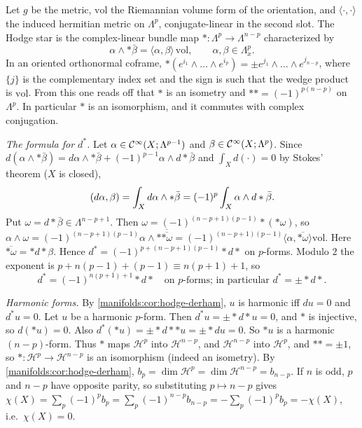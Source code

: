 \subsection*{}
Let $g$ be the metric, $\mathrm{vol}$ the Riemannian volume form of the orientation, and
$\langle\cdot,\cdot\rangle$ the induced hermitian metric on $\Lambda^p$, conjugate-linear in the
second slot. The Hodge star is the complex-linear bundle map
$*:\Lambda^p\to\Lambda^{n-p}$ characterized by
\begin{equation*}
\alpha\wedge*\bar\beta=\langle\alpha,\beta\rangle\,\mathrm{vol},\qquad\alpha,\beta\in\Lambda^p_x .
\end{equation*}
In an oriented orthonormal coframe, $*(e^{i_1}\wedge\dots\wedge e^{i_p})=\pm e^{j_1}\wedge\dots\wedge e^{j_{n-p}}$, where
$\{j\}$ is the complementary index set and the sign is such that the wedge product is
$\mathrm{vol}$. From this one reads off that $*$ is an isometry and $**=(-1)^{p(n-p)}$ on
$\Lambda^p$. In particular $*$ is an isomorphism, and it commutes with complex conjugation.

\emph{The formula for $d^*$.} Let $\alpha\in\mathcal{C}^\infty(X;\Lambda^{p-1})$ and $\beta\in\mathcal{C}^\infty(X;\Lambda^p)$.
Since $d(\alpha\wedge*\bar\beta)=d\alpha\wedge*\bar\beta+(-1)^{p-1}\alpha\wedge d*\bar\beta$ and
$\int_Xd(\cdot)=0$ by Stokes' theorem ($X$ is closed),
\begin{equation*}
( d\alpha, \beta)=\int_Xd\alpha\wedge*\bar\beta=(-1)^p\int_X\alpha\wedge d*\bar\beta .
\end{equation*}
Put $\omega=d*\bar\beta\in\Lambda^{n-p+1}$. Then $\omega=(-1)^{(n-p+1)(p-1)}*(*\omega)$, so
$\alpha\wedge\omega=(-1)^{(n-p+1)(p-1)}\alpha\wedge*\overline{\overline{*\omega}}
=(-1)^{(n-p+1)(p-1)}\langle\alpha,\overline{*\omega}\rangle\mathrm{vol}$. Here
$\overline{*\omega}=*d*\beta$. Hence $d^*=(-1)^{p+(n-p+1)(p-1)}*d*$ on $p$-forms. Modulo
$2$ the exponent is $p+n(p-1)+(p-1)\equiv n(p+1)+1$, so
\begin{equation*}
d^*=(-1)^{n(p+1)+1}*d*\quad\text{on $p$-forms; in particular } d^*=\pm*d* .
\end{equation*}

\emph{Harmonic forms.} By \cref{manifolds:cor:hodge-derham}, $u$ is harmonic iff $du=0$ and
$d^*u=0$. Let $u$ be a harmonic $p$-form. Then $d^*u=\pm*d*u=0$, and $*$ is injective, so
$d(*u)=0$. Also $d^*(*u)=\pm*d**u=\pm*du=0$. So $*u$ is a harmonic $(n-p)$-form. Thus $*$
maps $\mathcal H^p$ into $\mathcal H^{n-p}$, and $\mathcal H^{n-p}$ into $\mathcal H^p$, and
$**=\pm1$, so $*:\mathcal H^p\to\mathcal H^{n-p}$ is an isomorphism (indeed an isometry). By
\cref{manifolds:cor:hodge-derham}, $b_p=\dim\mathcal H^p=\dim\mathcal H^{n-p}=b_{n-p}$. If $n$ is
odd, $p$ and $n-p$ have opposite parity, so substituting $p\mapsto n-p$ gives
$\chi(X)=\sum_p(-1)^pb_p=\sum_p(-1)^{n-p}b_{n-p}=-\sum_p(-1)^pb_{p}=-\chi(X)$, i.e.\
$\chi(X)=0$.

